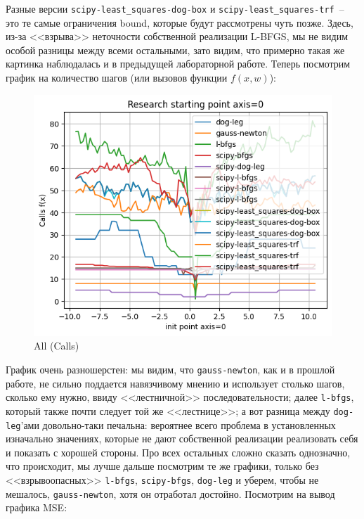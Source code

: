 \documentclass[12pt, a4paper, oneside, final]{article}
\begin{document}
	Разные версии \texttt{scipy-least\_squares-dog-box} и \texttt{scipy-least\_squares-trf}~-- это те самые ограничения bound, которые будут рассмотрены чуть позже.
	Здесь, из-за <<взрыва>> неточности собственной реализации L-BFGS, мы не видим особой разницы между всеми остальными, зато видим, что примерно такая же картинка наблюдалась и в предыдущей лабораторной работе.
	Теперь посмотрим график на количество шагов (или вызовов функции $f(x, w)$):
	\begin{figure}[H]
		\centering
		\includegraphics[scale = 1]{Image/T2A_LEAST_ALL_CALLS.png}
		\caption*{All (Calls)}
	\end{figure}
	График очень разношерстен: мы видим, что \texttt{gauss-newton}, как и в прошлой работе, не сильно поддается навязчивому мнению и использует столько шагов, сколько ему нужно, ввиду <<лестничной>> последовательности; далее \texttt{l-bfgs}, который также почти следует той же <<лестнице>>; а вот разница между \texttt{dog-leg}'ами довольно-таки печальна: вероятнее всего проблема в установленных изначально значениях, которые не дают собственной реализации реализовать себя и показать с хорошей стороны.
	Про всех остальных сложно сказать однозначно, что происходит, мы лучше дальше посмотрим те же графики, только без <<взрывоопасных>> \texttt{l-bfgs}, \texttt{scipy-bfgs}, \texttt{dog-leg} и уберем, чтобы не мешалось, \texttt{gauss-newton}, хотя он отработал достойно.
	Посмотрим на вывод графика MSE:
\end{document}
